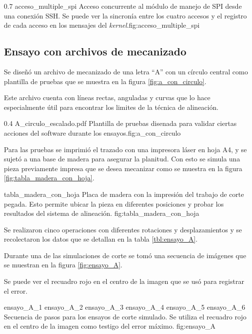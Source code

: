 \subfiga
{0.7} {acceso_multiple_spi} {Acceso concurrente al módulo de manejo de SPI desde una conexión SSH. Se puede ver la sincronía entre los cuatro accesos y el registro de cada acceso en los mensajes del \textit{kernel}.}{fig:acceso_multiple_spi}


\subsection{Ensayo con archivos de mecanizado}

Se diseñó un archivo de mecanizado de una letra ``A'' con un círculo central como plantilla de pruebas que se muestra en la figura \ref{fig:a_con_circulo}.\par

Este archivo cuenta con líneas rectas, anguladas y curvas que lo hace especialmente útil para encontrar los limites de la técnica de alineación. \par
\subfiga
{0.4} {A_circulo_escalado.pdf} {Plantilla de pruebas disenada para validar ciertas acciones del software durante los ensayos.}{fig:a_con_circulo}

Para las pruebas se imprimió el trazado con una impresora láser en hoja A4, y se sujetó a una base de madera para asegurar la planitud. Con esto se simula una pieza previamente impresa que se desea mecanizar como se muestra en la figura \ref{fig:tabla_madera_con_hoja}.\par

    {tabla_madera_con_hoja} {Placa de madera con la impresión del trabajo de corte pegada. Esto permite ubicar la pieza en diferentes posiciones y probar los resultados del sistema de alineación.} {fig:tabla_madera_con_hoja}

   Se realizaron cinco operaciones con diferentes rotaciones y desplazamientos y se recolectaron los datos que se detallan en la tabla \ref{tbl:ensayo_A}.\par
   Durante una de las simulaciones de corte se tomó una secuencia de imágenes que se muestran en la figura \ref{fig:ensayo_A}.\par
   Se puede ver el recuadro rojo en el centro de la imagen que se usó para registrar el error.\par

   \subfigthreethree
      {ensayo_A_1}
      {ensayo_A_2}
      {ensayo_A_3}
      {ensayo_A_4}
      {ensayo_A_5}
      {ensayo_A_6}
      {Secuencia de pasos para los ensayos de corte simulado. Se utiliza el recuadro rojo en el centro de la imagen como testigo del error máximo.}
      {fig:ensayo_A}

